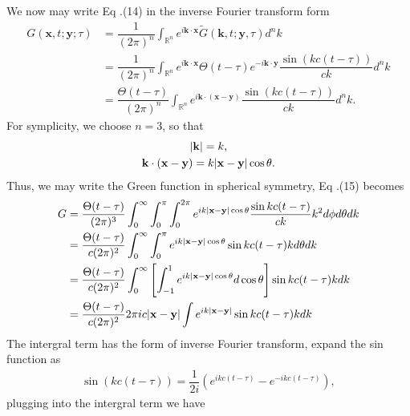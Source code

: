 \documentclass{article}
\newcommand{\f}[2]{\dfrac{#1}{#2}}
\begin{document}
We now may write Eq .(14) in the inverse Fourier transform form
\begin{equation}
	\begin{aligned}
		G(\mathbf{x},t;\mathbf{y};\tau) 
		&= \f{1}{(2\pi)^{n}} \int_{\mathbb{R}^{n}} e^{i \mathbf{k} \cdot \mathbf{x}} \tilde{G} (\mathbf{k}, t; \mathbf{y},\tau)  d^{n} k\\
		&= \f{1}{(2\pi)^{n}} \int_{\mathbb{R}^{n}} e^{i \mathbf{k} \cdot \mathbf{x}} \Theta(t - \tau) e^{-i \mathbf{k} \cdot \mathbf{y}} \f{\sin ( k c (t - \tau) )}{c k}  d^{n} k\\
		&= \f{\Theta(t - \tau)}{(2\pi)^{n}} \int_{\mathbb{R}^{n}} e^{i \mathbf{k} \cdot (\mathbf{x} - \mathbf{y})}   \f{\sin ( k c (t - \tau) )}{c k}  d^{n} k.
	\end{aligned}
\end{equation}	
For symplicity, we choose $n = 3$, so that
\begin{gather}
	\abs{\mathbf{k}} = k,\\
	\mathbf{k} \cdot (\mathbf{x} - \mathbf{y}) = k \abs{\mathbf{x} - \mathbf{y}} \cos \theta.
\end{gather}	
Thus, we may write the Green function in spherical symmetry, Eq .(15) becomes
\begin{equation}
	\begin{aligned}
		G 
		&= \f{\Theta(t - \tau)}{(2\pi)^{3}} \int_{0}^{\infty} \int_{0}^{\pi} \int_{0}^{2\pi} e^{ i k \abs{\mathbf{x} - \mathbf{y}} \cos \theta} \f{\sin kc(t - \tau)}{ck} k^{2} d\phi d\theta dk\\ 
		&= \f{\Theta(t - \tau)}{c(2\pi)^{2}} \int_{0}^{\infty} \int_{0}^{\pi} e^{ i k \abs{\mathbf{x} - \mathbf{y}} \cos \theta} \sin kc(t - \tau) k d\theta dk\\ 
		&= \f{\Theta(t - \tau)}{c(2\pi)^{2}} \int_{0}^{\infty} \left[ \int_{-1}^{1} e^{ i k \abs{\mathbf{x} - \mathbf{y}} \cos \theta} d \cos\theta \right] \sin kc(t - \tau) k  dk\\ 
		&= \f{\Theta(t - \tau)}{c(2\pi)^{2}} 2 \pi i c \abs{\mathbf{x} - \mathbf{y}} \int e^{ i k \abs{\mathbf{x} - \mathbf{y}}} \sin kc(t - \tau) k  dk
	\end{aligned}
\end{equation}
The intergral term has the form of inverse Fourier transform, expand the sin function as
\begin{gather}
	\sin(kc(t - \tau)) = \f{1}{2i} \left( e^{i k c (t - \tau)} - e^{-ikc (t -\tau)} \right),
\end{gather}
plugging into the intergral term we have
\end{document}
